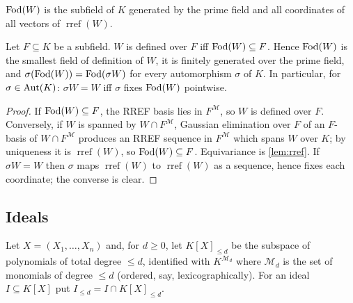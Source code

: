 \begin{definition}\label{def:fod-subspace}
$\operatorname{Fod}(W)$ is the subfield of $K$ generated by the prime field and all coordinates
of all vectors of $\operatorname{rref}(W)$.
\end{definition}

\begin{lemma}\label{lem:fod-subspace}
Let $F\subseteq K$ be a subfield.  $W$ is defined over $F$ iff $\operatorname{Fod}(W)\subseteq F$.
Hence $\operatorname{Fod}(W)$ is the smallest field of definition of $W$, it is finitely generated
over the prime field, and $\sigma(\operatorname{Fod}(W))=\operatorname{Fod}(\sigma W)$ for every automorphism
$\sigma$ of $K$.  In particular, for $\sigma\in\operatorname{Aut}(K)$: $\sigma W=W$ iff $\sigma$ fixes
$\operatorname{Fod}(W)$ pointwise.
\end{lemma}
\begin{proof}
If $\operatorname{Fod}(W)\subseteq F$, the RREF basis lies in $F^{\mathcal M}$, so $W$ is defined over
$F$.  Conversely, if $W$ is spanned by $W\cap F^{\mathcal M}$, Gaussian elimination over
$F$ of an $F$-basis of $W\cap F^{\mathcal M}$ produces an RREF sequence in
$F^{\mathcal M}$ which spans $W$ over $K$; by uniqueness it is $\operatorname{rref}(W)$,
so $\operatorname{Fod}(W)\subseteq F$.  Equivariance is \cref{lem:rref}.  If $\sigma W=W$ then $\sigma$
maps $\operatorname{rref}(W)$ to $\operatorname{rref}(W)$ as a sequence, hence fixes each
coordinate; the converse is clear.
\end{proof}

\subsection{Ideals}

Let $X=(X_1,\dots,X_n)$ and, for $d\ge0$, let $K[X]_{\le d}$ be the subspace of
polynomials of total degree $\le d$, identified with $K^{\mathcal M_d}$ where
$\mathcal M_d$ is the set of monomials of degree $\le d$ (ordered, say,
lexicographically).  For an ideal $I\subseteq K[X]$ put $I_{\le d}=I\cap K[X]_{\le d}$.


